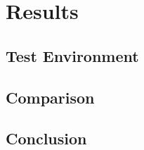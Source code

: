 \section{Results}

\subsection{Test Environment}

\subsection{Comparison}

\subsection{Conclusion}

\newpage
